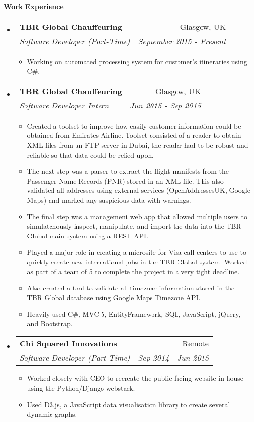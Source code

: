 \documentclass[letterpaper,11pt]{article}
\makeatletter
\newcommand{\resitem}[1]{\item #1 \vspace{-2pt}}
\newcommand{\resheading}[1]{{\large \colorbox{mygrey}{\begin{minipage}{\textwidth}{\textbf{#1 \vphantom{p\^{E}}}}\end{minipage}}}}
\newcommand{\ressubheading}[4]{
\begin{tabular*}{7.0in}{l@{\extracolsep{\fill}}r}
	\textbf{#1} & #2 \\
	\textit{#3} & \textit{#4} \\
\end{tabular*}\vspace{-6pt}}
\makeatother
\begin{document}
	\resheading{Work Experience}
	\begin{itemize}
		\item
		\ressubheading{TBR Global Chauffeuring}{Glasgow, UK}{Software Developer (Part-Time)}{September 2015 - Present}
		\begin{itemize}
			\resitem{Working on automated processing system for customer's itineraries using C\#.}
		\end{itemize}

		\item
		\ressubheading{TBR Global Chauffeuring}{Glasgow, UK}{Software Developer Intern}{Jun 2015 - Sep 2015}
		\begin{itemize}
			\resitem{Created a toolset to improve how easily customer information could be obtained from Emirates Airline.
			Toolset consisted of a reader to obtain XML files from an FTP server in Dubai, the reader had to be robust and
			reliable so that data could be relied upon.}
			\resitem {The next step was a parser to extract the flight manifests from the Passenger Name Records (PNR) stored
			in an XML file. This also validated all addresses using external services (OpenAddressesUK, Google Maps) and marked
			any suspicious data with warnings.}
			\resitem {The final step was a management web app that allowed multiple users to simulatenously inspect, manipulate,
			and import the data into the TBR Global main system using a REST API.}
			\resitem {Played a major role in creating a microsite for Visa call-centers to use to quickly create new international
			jobs in the TBR Global system. Worked as part of a team of 5 to complete the project in a very tight deadline.}
			\resitem {Also created a tool to validate all timezone information stored in the TBR Global database using Google
			Maps Timezone API.}
			\resitem {Heavily used C\#, MVC 5, EntityFramework, SQL, JavaScript, jQuery, and Bootstrap.}
		\end{itemize}

		\item
		\ressubheading{Chi Squared Innovations}{Remote}{Software Developer (Part-Time)}{Sep 2014 - Jun 2015}
		\begin{itemize}
			\resitem {Worked closely with CEO to recreate the public facing website in-house using the Python/Django webstack.}
			\resitem {Used D3.js, a JavaScript data visualisation library to create several dynamic graphs.}
		\end{itemize}

	\end{itemize}
\end{document}
